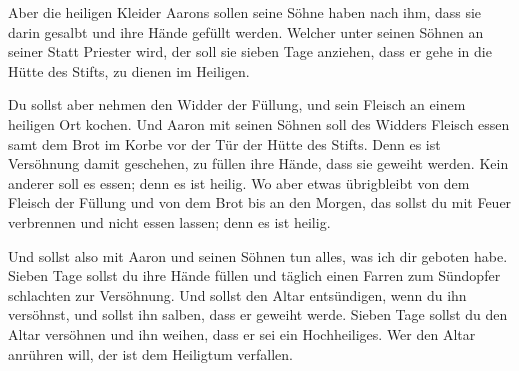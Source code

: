  Aber die heiligen Kleider Aarons sollen seine Söhne haben
nach ihm, dass sie darin gesalbt und ihre Hände gefüllt werden.
 Welcher unter seinen Söhnen an seiner Statt Priester wird,
der soll sie sieben Tage anziehen, dass er gehe in die Hütte des Stifts,
zu dienen im Heiligen.

 Du sollst aber nehmen den Widder der Füllung, und sein
Fleisch an einem heiligen Ort kochen.  Und Aaron mit seinen
Söhnen soll des Widders Fleisch essen samt dem Brot im Korbe vor der Tür
der Hütte des Stifts.  Denn es ist Versöhnung damit
geschehen, zu füllen ihre Hände, dass sie geweiht werden. Kein anderer
soll es essen; denn es ist heilig.  Wo aber etwas
übrigbleibt von dem Fleisch der Füllung und von dem Brot bis an den
Morgen, das sollst du mit Feuer verbrennen und nicht essen lassen; denn
es ist heilig.

 Und sollst also mit Aaron und seinen Söhnen tun alles, was
ich dir geboten habe. Sieben Tage sollst du ihre Hände füllen
 und täglich einen Farren zum Sündopfer schlachten zur
Versöhnung. Und sollst den Altar entsündigen, wenn du ihn versöhnst, und
sollst ihn salben, dass er geweiht werde.  Sieben Tage
sollst du den Altar versöhnen und ihn weihen, dass er sei ein
Hochheiliges. Wer den Altar anrühren will, der ist dem Heiligtum
verfallen.

